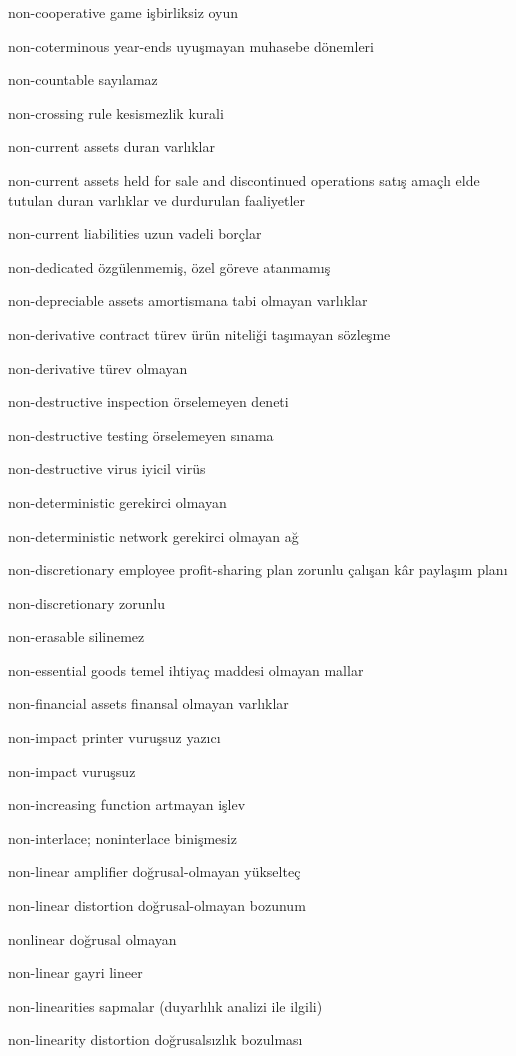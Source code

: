 \documentclass[12pt,fleqn]{article}\usepackage{../../common}
\begin{document}
non-cooperative game işbirliksiz oyun

non-coterminous year-ends uyuşmayan muhasebe dönemleri

non-countable sayılamaz

non-crossing rule kesismezlik kurali

non-current assets duran varlıklar

non-current assets held for sale and discontinued operations satış amaçlı elde tutulan duran varlıklar ve durdurulan faaliyetler

non-current liabilities uzun vadeli borçlar

non-dedicated özgülenmemiş, özel göreve atanmamış

non-depreciable assets amortismana tabi olmayan varlıklar

non-derivative contract türev ürün niteliği taşımayan sözleşme

non-derivative türev olmayan

non-destructive inspection örselemeyen deneti

non-destructive testing örselemeyen sınama

non-destructive virus iyicil virüs

non-deterministic gerekirci olmayan

non-deterministic network gerekirci olmayan ağ

non-discretionary employee profit-sharing plan zorunlu çalışan kâr paylaşım planı

non-discretionary zorunlu

non-erasable silinemez

non-essential goods temel ihtiyaç maddesi olmayan mallar

non-financial assets finansal olmayan varlıklar

non-impact printer vuruşsuz yazıcı

non-impact vuruşsuz

non-increasing function artmayan işlev

non-interlace; noninterlace binişmesiz

non-linear amplifier doğrusal-olmayan yükselteç

non-linear distortion doğrusal-olmayan bozunum

nonlinear doğrusal olmayan

non-linear gayri lineer

non-linearities sapmalar (duyarlılık analizi ile ilgili)

non-linearity distortion doğrusalsızlık bozulması
\end{document}
